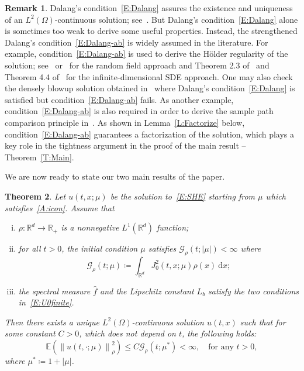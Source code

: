 \documentclass[a4paper,11pt]{article}%
\theoremstyle{plain}
\newtheorem{theorem}{Theorem}[section]
\theoremstyle{definition}
\newtheorem{remark}[theorem]{Remark}
\numberwithin{equation}{section}
\newcommand{\R}{\mathbb{R}}
\newcommand{\E}{\mathbb{E}}
\newcommand{\Norm}[1]{\left\| #1 \right\|}
\newcommand{\ud}{\ensuremath{\mathrm{d}}}
\begin{document}
\begin{remark}
  Dalang's condition~\eqref{E:Dalang} assures the existence and uniqueness of an
  $L^2\left(\Omega\right)$-continuous solution; see~\cite{dalang:99:extending}. But Dalang's
  condition~\eqref{E:Dalang} alone is sometimes too weak to derive some useful properties. Instead,
  the strengthened Dalang's condition~\eqref{E:Dalang-ab} is widely assumed in the literature. For
  example, condition~\eqref{E:Dalang-ab} is used to derive the H\"older regularity of the solution;
  see~\cite[Theorem 1.8]{chen.huang:19:comparison} or~\cite{sanz-sole.sarra:02:holder} for the
  random field approach and Theorem 2.3 of~\cite{peszat.zabczyk:97:stochastic} and Theorem 4.4
  of~\cite{tessitore.zabczyk:98:invariant} for the infinite-dimensional SDE approach. One may also
  check the densely blowup solution obtained in~\cite{chen.huang.ea:19:dense} where Dalang's
  condition~\eqref{E:Dalang} is satisfied but condition~\eqref{E:Dalang-ab} fails. As another
  example, condition~\eqref{E:Dalang-ab} is also required in order to derive the sample path
  comparison principle in~\cite{chen.huang:19:comparison}. As shown in Lemma~\ref{L:Factorize}
  below, condition~\eqref{E:Dalang-ab} guarantees a factorization of the solution, which plays a key
  role in the tightness argument in the proof of the main result -- Theorem~\ref{T:Main}.
\end{remark}

We are now ready to state our two main results of the paper.

\begin{theorem}\label{T:Lrho}
  Let $u(t,x;\mu)$ be the solution to~\eqref{E:SHE} starting from $\mu$ which
  satisfies~\eqref{A:icon}. Assume that
  \begin{enumerate}[(i)]
    \item $\rho: \R^d \to \R_+$ is a nonnegative $L^1 (\R^d)$ function;
    \item for all $t > 0$, the initial condition $\mu$ satisfies $\mathcal{G}_{\rho}(t;|\mu|) <
      \infty$ where
      \begin{equation}\label{E:G}
        \mathcal{G}_{\rho}(t;\mu)
        \coloneqq \int_{\R^d} J_0^2\left(t,x;\mu\right) \rho(x)\: \ud x;
      \end{equation}
    \item the spectral measure $\widehat{f}$ and the Lipschitz constant $L_b$ satisfy the two
      conditions in~\eqref{E:U0finite}.
  \end{enumerate}
  Then there exists a unique $L^2 (\Omega)$-continuous solution $u(t,x)$ such that for some constant
  $C>0$, which does not depend on $t$, the following holds:
  \begin{equation}\label{E:uInLrho}
    \E\left(\Norm{u(t,\cdot; \mu)}_{\rho}^2\right)
    \le C \mathcal{G}_{\rho}(t; \mu^*)
    < \infty, \quad \text{for any $t > 0$},
  \end{equation}
  where $ \mu^* \coloneqq 1 + |\mu|$.
\end{theorem}
\end{document}
